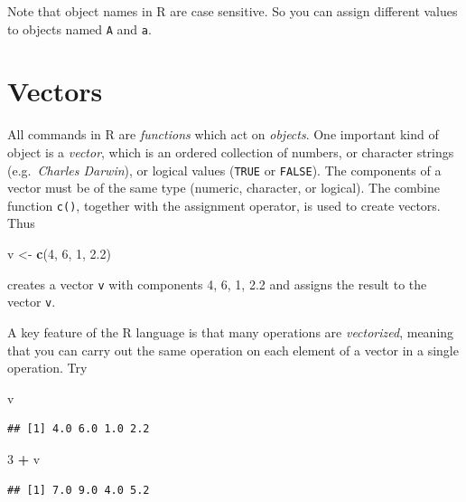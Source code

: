 \documentclass[
]{book}
\newenvironment{Shaded}{\begin{snugshade}}{\end{snugshade}}
\newcommand{\DecValTok}[1]{\textcolor[rgb]{0.00,0.00,0.81}{#1}}
\newcommand{\FloatTok}[1]{\textcolor[rgb]{0.00,0.00,0.81}{#1}}
\newcommand{\FunctionTok}[1]{\textcolor[rgb]{0.13,0.29,0.53}{\textbf{#1}}}
\newcommand{\NormalTok}[1]{#1}
\newcommand{\OtherTok}[1]{\textcolor[rgb]{0.56,0.35,0.01}{#1}}
\newcommand{\SpecialCharTok}[1]{\textcolor[rgb]{0.81,0.36,0.00}{\textbf{#1}}}
\theoremstyle{definition}
\theoremstyle{definition}
\theoremstyle{definition}
\theoremstyle{definition}
\theoremstyle{remark}
\begin{document}
Note that object names in R are case sensitive. So you can assign
different values to objects named \texttt{A} and \texttt{a}.

\section{Vectors}\label{vectors}

All commands in R are \emph{functions} which act on \emph{objects}. One
important kind of object is a \emph{vector}, which is an ordered
collection of numbers, or character strings (e.g.~\emph{Charles Darwin}),
or logical values (\texttt{TRUE} or \texttt{FALSE}). The components of a
vector must be of the same type (numeric, character, or logical). The
combine function \texttt{c()}, together with the assignment operator, is
used to create vectors. Thus

\begin{Shaded}
\begin{Highlighting}[]
\NormalTok{v }\OtherTok{\textless{}{-}} \FunctionTok{c}\NormalTok{(}\DecValTok{4}\NormalTok{, }\DecValTok{6}\NormalTok{, }\DecValTok{1}\NormalTok{, }\FloatTok{2.2}\NormalTok{)}
\end{Highlighting}
\end{Shaded}

creates a vector \texttt{v} with components 4, 6, 1, 2.2 and assigns the
result to the vector \texttt{v}.

A key feature of the R language is that many operations are \emph{vectorized},
meaning that you can carry out the same operation on
each element of a vector in a single operation. Try

\begin{Shaded}
\begin{Highlighting}[]
\NormalTok{v}
\end{Highlighting}
\end{Shaded}

\begin{verbatim}
## [1] 4.0 6.0 1.0 2.2
\end{verbatim}

\begin{Shaded}
\begin{Highlighting}[]
\DecValTok{3} \SpecialCharTok{+}\NormalTok{ v}
\end{Highlighting}
\end{Shaded}

\begin{verbatim}
## [1] 7.0 9.0 4.0 5.2
\end{verbatim}
\end{document}
